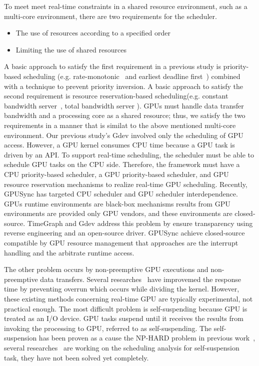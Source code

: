 To meet meet real-time constraints in a shared resource environment, such as a multi-core environment,
there are two requirements for the scheduler.
\begin{itemize}
\item The use of resources according to a specified order
\item Limiting the use of shared resources
\end{itemize}
A basic approach to satisfy the first requirement in a previous study is priority-based scheduling (e.g. rate-monotonic~\cite{sched:rm} and earliest deadline first~\cite{sched:edf}) combined with a technique to prevent priority inversion.
A basic approach to satisfy the second requirement is resource reservation-based scheduling(e.g. constant bandwidth server~\cite{rr:cbs}, total bandwidth server\cite{rr:tbs2} ).
GPUs must handle data transfer bandwidth and a processing core as a shared resource; thus, we satisfy the two requirements in a manner that is similat to the above mentioned multi-core environment.
Our previous study's Gdev involved only the scheduling of GPU access.
However, a GPU kernel consumes CPU time because a GPU task is driven by an API.
To support real-time scheduling, the scheduler must be able to schedule GPU tasks on the CPU side.
Therefore, the framework must have a CPU priority-based scheduler, a GPU priority-based scheduler, and GPU resource reservation mechanisms to realize real-time GPU scheduling.
Recently, GPUSync has targeted CPU scheduler and GPU scheduler interdependence.
GPUs runtime environments are black-box mechanisms results from GPU environments are provided only GPU vendors, and these environments are closed-source.
TimeGraph and Gdev address this problem by ensure transparency using reverse engineering and an open-source driver.
GPUSync achieve closed-source compatible by GPU resource management that approaches are the interrupt handling and the arbitrate runtime access.

The other problem occurs by non-preemptive GPU executions and non-preemptive data transfers.
Several researches~\cite{basaran:preemptive,sparc} have improvemed the response time by preventing overrun which occurs while dividing the kernel.
However, these existing methods concerning real-time GPU are typically experimental, not practical enough.
The most difficult problem is self-suspending because GPU is treated as an I/O device.
GPU tasks suspend until it receives the results from invoking the processing to GPU, referred to as self-suspending.
The self-suspension has been proven as a cause the NP-HARD problem in previous work~\cite{self-sus:1,self-sus:2},
several researches~\cite{chattopadhyay2014limited,kim2013segment} are working on the scheduling analysis for self-suspension task,
they have not been solved yet completely.


